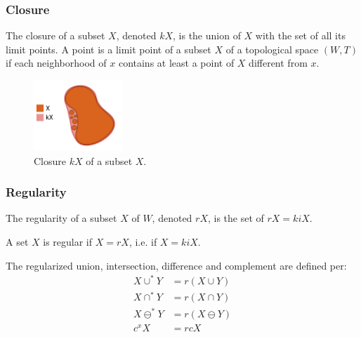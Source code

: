 \documentclass[a4paper,11pt,oneside]{article}
\begin{document}
\subsubsection{Closure}
    
\begin{definition}
	The closure of a subset $X$, denoted $kX$, is the union of $X$ with the set of all its limit points. A point is a limit point of a subset $X$ of a topological space $(W, T)$ if each neighborhood of $x$ contains at least a point of $X$ different from $x$. \cite{Requicha1978MathematicalFO}
\end{definition}
    
\begin{figure}[ht]
	\begin{center}
		\includegraphics[width=0.3\textwidth]{section3/3.1/closure.png}
	\end{center}
	\caption{Closure $kX$ of a subset $X$.}
	\label{sect3:closure}
\end{figure}
    
\subsubsection{Regularity}
    
\begin{definition}[Regularity]
	The regularity of a subset $X$ of $W$, denoted $rX$, is the set of $rX = kiX$. \cite{mansfield_1987}
\end{definition}
\begin{definition}
	A set $X$ is regular if $X = rX$, i.e. if $X = kiX$. \cite{mansfield_1987}
\end{definition}
    
\begin{definition}
	The regularized union, intersection, difference and complement are defined per:
	\begin{align*} 
		X \cup^* Y   & = r(X \cup Y)    \\
		X \cap^* Y   & = r(X \cap Y)    \\
		X \ominus^*Y & = r(X \ominus Y) \\
		c{^x}X       & = rcX            
	\end{align*}
\end{definition}
    
\end{document}
